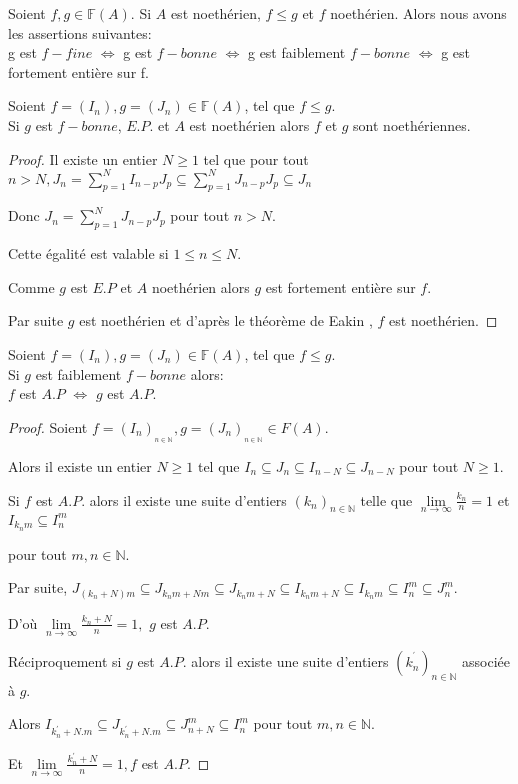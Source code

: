 \begin{moncorollaire}
	\label{maprop9}
	Soient $f,g \in \mathbb{F}(A)$. Si $A$ est noethérien, $f \leqslant g$ et $f$ noethérien. Alors nous avons les assertions suivantes:\\
	g est $f-fine$ $\Longleftrightarrow$  g est $f-bonne$ $\Longleftrightarrow$  g est faiblement $f-bonne$ $\Longleftrightarrow$  g est fortement entière sur f.
\end{moncorollaire}
\begin{maproposition}
	Soient $f=(I_n), g=(J_n) \in \mathbb{F}(A)$, tel que $f \leqslant g$.\\ Si $g$ est $f-bonne$, $E.P.$ et $A$ est noethérien alors $f$ et $g$ sont noethériennes.
\end{maproposition}
\begin{proof}
	Il existe un entier $N\geq 1$ tel que pour tout $n>N,J_{n}=\sum
	\limits_{p=1}^{N}I_{n-p}J_{p}\subseteq
	\sum\limits_{p=1}^{N}J_{n-p}J_{p}\subseteq J_{n}$
	
	Donc $J_{n}=\sum\limits_{p=1}^{N}J_{n-p}J_{p}$ pour tout $n>N.$
	
	Cette égalité est valable si $1\leq n\leq N.$
	
	Comme $g$ est $E.P$ et $A$ noethérien alors $g$ est fortement entière sur $f.$ 
	
	Par suite $g$ est noethérien et d'après le théorème de
	Eakin \cite{Eak}, $f$ est noethérien. 
\end{proof}
\begin{maproposition}
	Soient $f=(I_n), g=(J_n) \in \mathbb{F}(A)$, tel que $f \leqslant g$.\\Si $g$ est faiblement $f-bonne$ alors:\\ $f$ est $A.P$ $\Longleftrightarrow$ $g$ est $A.P$.
\end{maproposition}
\begin{proof}
	Soient $f=(I_{n})_{_{n\in \mathbb{N}}},g=(J_{n})_{_{n\in\mathbb{N}}}\in F(A).$
	
	Alors il existe un entier $N\geq 1$ tel que $I_{n}\subseteq J_{n}\subseteq
	I_{n-N}\subseteq J_{n-N}$ pour tout $N\geq 1.$
	
	Si $f$ est $A.P.$ alors il existe une suite d'entiers $(k_{n})_{n\in \mathbb{N}}$ telle que $\underset{n\longrightarrow \infty }{\lim }\frac{k_{n}}{n}=1$
	et $I_{k_{n}m}\subseteq I_{n}^{m}$
	
	pour tout $m,n\in \mathbb{N}.$
	
	Par suite, $J_{(k_{n}+N)m}\subseteq J_{k_{n}m+Nm}\subseteq
	J_{k_{n}m+N}\subseteq I_{k_{n}m+N}\subseteq I_{k_{n}m}\subseteq
	I_{n}^{m}\subseteq J_{n}^{m}.$
	
	D'où $\underset{n\longrightarrow \infty }{\lim }\frac{k_{n}+N}{n
	}=1,$ $g$ est $A.P.$
	
	Réciproquement si $g$ est $A.P.$ alors il existe une suite d'entiers $(k_{n}^{^{\prime }})_{n\in \mathbb{N}}$ associée à $g.$
	
	Alors $I_{k_{n}^{\prime }+N.m}\subseteq J_{k_{n}^{\prime }+N.m}\subseteq
	J_{n+N}^{m}\subseteq I_{n}^{m}$ pour tout $m,n\in \mathbb{N}.$
	
	Et $\underset{n\longrightarrow \infty }{\lim }\frac{k_{n}^{\prime }+N}{n}=1,f
	$ est $A.P.$
\end{proof}
